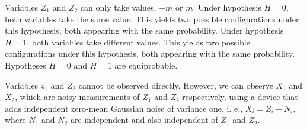 \begin{solution}
\end{solution}

\else

\question[30] %

Variables $Z_1$ and $Z_2$ can only take values, $-m$ or $m$. Under hypothesis $H=0$, both variables take the same value. This yields two possible configurations under this hypothesis, both appearing with the same probability. Under hypothesis $H=1$, both variables take different values. This yields two possible configurations under this hypothesis, both appearing with the same probability. Hypotheses $H=0$ and $H=1$ are equiprobable.

Variables $z_1$ and $Z_2$ cannot be observed directly. However, we can observe $X_1$ and $X_2$, which are noisy measurements of $Z_1$ and $Z_2$ respectively, using a device that adds independent zero-mean Gaussian noise of variance one, i. e., $X_i=Z_i+N_i$, where $N_1$ and $N_2$ are independent and also independent of $Z_1$ and $Z_2$.



\begin{solution}
\begin{parts}
\part 
\end{parts}
\end{solution}

\fi
